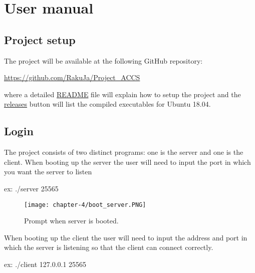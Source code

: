 
\chapter{User manual}
\label{cap:user-manual}

\section{Project setup}

The project will be available at the following GitHub repository: \newline{}
\centerline{\href{https://github.com/RakuJa/Project\_ACCS}{https://github.com/RakuJa/Project\_ACCS}} \newline{}
where a detailed \href{https://github.com/RakuJa/Project_ACCS/blob/main/README.MD}{README} file will explain how to setup the project and the \href{https://github.com/RakuJa/Project_ACCS/releases}{releases} button will list the compiled executables for Ubuntu 18.04.

\section{Login}

The project consists of two distinct programs: one is the server and one is the client.
When booting up the server the user will need to input the port in which you want the server to listen \newline{}
\centerline{ex: ./server 25565} \newline{}

\begin{figure}[!h] 
    \centering 
    \texttt{[image: chapter-4/boot\_server.PNG]} 
    \caption{Prompt when server is booted.}
    \label{fig:booted_server_prompt}
\end{figure}
When booting up the client the user will need to input the address and port in which the server is listening so that the client can connect correctly. \newline{}
\centerline{ex: ./client 127.0.0.1 25565} \newline{}

